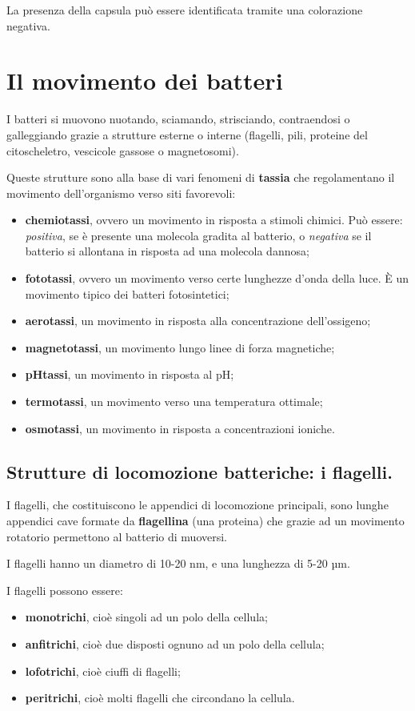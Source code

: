 \documentclass[11pt]{book}
\begin{document}
\vspace{1em}
La presenza della capsula può essere identificata tramite una colorazione negativa.

\chapter{Il movimento dei batteri}

I batteri si muovono nuotando, sciamando, strisciando, contraendosi o galleggiando grazie a strutture esterne o interne (flagelli, pili, proteine del citoscheletro, vescicole gassose o magnetosomi).

Queste strutture sono alla base di vari fenomeni di \textbf{tassia} che regolamentano il movimento dell'organismo verso siti favorevoli:
\begin{itemize}
\item \textbf{chemiotassi}, ovvero un movimento in risposta a stimoli chimici. Può essere: \emph{positiva}, se è presente una molecola gradita al batterio, o \emph{negativa} se il batterio si allontana in risposta ad una molecola dannosa;
\item \textbf{fototassi}, ovvero un movimento verso certe lunghezze d’onda della luce. È un movimento tipico dei batteri fotosintetici;
\item \textbf{aerotassi}, un movimento in risposta alla concentrazione dell’ossigeno;
\item \textbf{magnetotassi}, un movimento lungo linee di forza magnetiche;
\item \textbf{pHtassi}, un movimento in risposta al pH;
\item \textbf{termotassi}, un movimento verso una temperatura ottimale;
\item \textbf{osmotassi}, un movimento in risposta a concentrazioni ioniche.
\end{itemize}

\section{Strutture di locomozione batteriche: i flagelli.}

I flagelli, che costituiscono le appendici di locomozione principali, sono lunghe appendici cave formate da \textbf{flagellina} (una proteina) che grazie ad un movimento rotatorio permettono al batterio di muoversi.

I flagelli hanno un diametro di 10-20 nm, e una lunghezza di 5-20 µm.

\vspace{1em}
I flagelli possono essere:
\begin{itemize}
\item \textbf{monotrichi}, cioè singoli ad un polo della cellula; 
\item \textbf{anfitrichi}, cioè due disposti ognuno ad un polo della cellula; 
\item \textbf{lofotrichi}, cioè ciuffi di flagelli; 
\item \textbf{peritrichi}, cioè molti flagelli che circondano la cellula.
\end{itemize}
\end{document}
